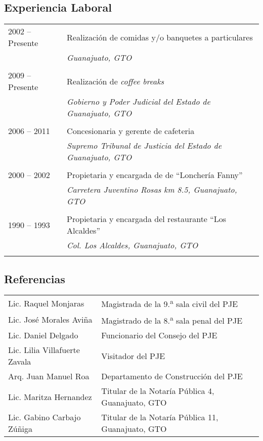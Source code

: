 \documentclass[12pt]{article}
\begin{document}
\subsection*{Experiencia Laboral}
\begin{tabular}{l|p{11cm}}
2002 -- Presente				&	Realización de comidas y/o banquetes a particulares \\
								&	\emph{\small Guanajuato, GTO}\\
									\multicolumn{2}{c}{} \\
2009 -- Presente				&	Realización de \emph{coffee breaks}\\
								&	\emph{\small Gobierno y Poder Judicial del Estado de Guanajuato, GTO}\\
									\multicolumn{2}{c}{} \\
2006 -- 2011					&	Concesionaria y gerente de cafeteria\\
								&	\emph{\small Supremo Tribunal de‎ Justicia del Estado de Guanajuato, GTO}\\
									\multicolumn{2}{c}{} \\
2000 -- 2002					&	Propietaria y encargada de de ``Lonchería Fanny''\\
								&	\emph{\small Carretera Juventino Rosas km‭ ‬8.5‭, Guanajuato, GTO}\\
									\multicolumn{2}{c}{} \\
1990 -- 1993					&	Propietaria y encargada del restaurante ``Los Alcaldes''\\
								&	\emph{\small Col. Los Alcaldes, Guanajuato, GTO}\\
									\multicolumn{2}{c}{} \\
\end{tabular}

\subsection*{Referencias}
\begin{tabular}{l l}
Lic.‭ ‬Raquel Monjaras				&			Magistrada de la 9.\textsuperscript{a} sala civil del PJE\\
Lic.‭ ‬José‭ Morales Aviña				&			Magistrado de la 8.\textsuperscript{a} sala penal del PJE\\
Lic.‭ Daniel Delgado					&			Funcionario del Consejo del PJE\\
Lic.‭ ‬Lilia Villafuerte Zavala		&			Visitador del PJE\\
Arq.‭ ‬Juan Manuel‭ Roa				&			‬Departamento de Construcción del PJE\\
Lic.‭ ‬Maritza Hernandez				&			Titular de la Notaría Pública 4, Guanajuato, GTO\\
Lic. Gabino Carbajo Zúñiga			&			Titular de la Notaría Pública 11, Guanajuato, GTO\\
\end{tabular}
\newpage
\end{document}
